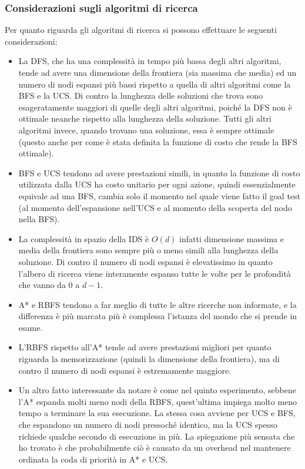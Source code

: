 \documentclass{article}
\begin{document}
	\subsubsection{Considerazioni sugli algoritmi di ricerca}
	Per quanto riguarda gli algoritmi di ricerca si possono effettuare le seguenti considerazioni:
	\begin{itemize}
		\item La DFS, che ha una complessità in tempo più bassa degli altri algoritmi, tende ad avere una dimensione della frontiera (sia massima che media) ed un numero di nodi espansi più bassi rispetto a quella di altri algoritmi come la BFS e la UCS. Di contro la lunghezza delle soluzioni che trova sono esageratamente maggiori di quelle degli altri algoritmi, poiché la DFS non è ottimale neanche rispetto alla lunghezza della soluzione. Tutti gli altri algoritmi invece, quando trovano una soluzione, essa è sempre ottimale (questo anche per come è stata definita la funzione di costo che rende la BFS ottimale).
		\item BFS e UCS tendono ad avere prestazioni simili, in quanto la funzione di costo utilizzata dalla UCS ha costo unitario per ogni azione, quindi essenzialmente equivale ad una BFS, cambia solo il momento nel quale viene fatto il goal test (al momento dell'espansione nell'UCS e al momento della scoperta del nodo nella BFS).
		\item La complessità in spazio della IDS è $O(d)$ infatti dimensione massima e media della frontiera sono sempre più o meno simili alla lunghezza della soluzione. Di contro il numero di nodi espansi è elevatissimo in quanto l'albero di ricerca viene interamente espanso tutte le volte per le profondità che vanno da $0$ a $d-1$.
		\item A* e RBFS tendono a far meglio di tutte le altre ricerche non informate, e la differenza è più marcata più è complessa l'istanza del mondo che si prende in esame.
		\item L'RBFS rispetto all'A* tende ad avere prestazioni migliori per quanto riguarda la memorizzazione (quindi la dimensione della frontiera), ma di contro il numero di nodi espansi è estremamente maggiore.
		\item Un altro fatto interessante da notare è come nel quinto esperimento, sebbene l'A* espanda molti meno nodi della RBFS, quest'ultima impiega molto meno tempo a terminare la sua esecuzione. La stessa cosa avviene per UCS e BFS, che espandono un numero di nodi pressoché identico, ma la UCS spesso richiede qualche secondo di esecuzione in più. La spiegazione più sensata che ho trovato è che probabilmente ciò è causato da un overhead nel mantenere ordinata la coda di priorità in A* e UCS.
	\end{itemize}
\end{document}
